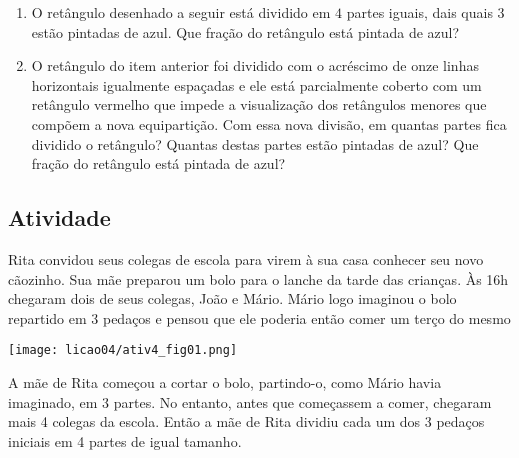 \begin{enumerate} [\quad a)] %
  \item     O retângulo desenhado a seguir está dividido em     $4$ partes iguais, dais quais     $3$ estão pintadas de azul. Que fração do retângulo está pintada de azul?
  \begin{center}
\end{center}

\item     O retângulo do item anterior foi dividido com o acréscimo de onze linhas horizontais igualmente espaçadas e ele está parcialmente coberto com um retângulo vermelho que impede a visualização dos retângulos menores que compõem a nova equipartição. Com essa nova divisão, em quantas partes fica dividido o retângulo? Quantas destas partes estão pintadas de azul? Que fração do retângulo está pintada de azul?     \mbox{} \newline
\end{enumerate} %

\begin{center}
\end{center}

\subsection{Atividade}
Rita convidou seus colegas de escola para virem à sua casa conhecer seu novo cãozinho. Sua mãe preparou um bolo para o lanche da tarde das crianças. Às 16h chegaram dois de seus colegas, João e Mário. Mário logo imaginou o bolo repartido em 3 pedaços e pensou que ele poderia então comer um terço do mesmo

\begin{center}
\texttt{[image: licao04/ativ4\_fig01.png]}
\end{center}

A mãe de Rita começou a cortar o bolo, partindo-o, como Mário havia imaginado, em 3 partes. No entanto, antes que começassem a comer, chegaram mais 4 colegas da escola. Então a mãe de Rita dividiu cada um dos 3 pedaços iniciais em 4 partes de igual tamanho.

